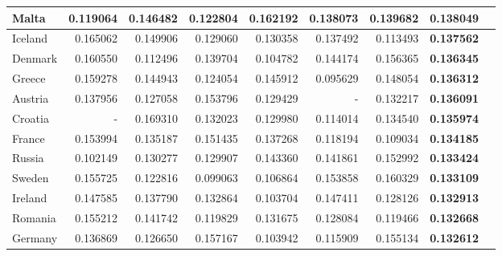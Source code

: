 \documentclass[a4paper,11pt]{report}
\begin{document}
\begin{table}[h!]
\begin{tabular}{|l|r|r|r|r|r|r|r|r|}
Malta                                                      & 0.119064      & 0.146482      & 0.122804      & 0.162192      & 0.138073      & 0.139682      & \textbf{0.138049} \\ \hline
Iceland                                                    & 0.165062      & 0.149906      & 0.129060      & 0.130358      & 0.137492      & 0.113493      & \textbf{0.137562} \\ \hline
Denmark                                                    & 0.160550      & 0.112496      & 0.139704      & 0.104782      & 0.144174      & 0.156365      & \textbf{0.136345} \\ \hline
Greece                                                     & 0.159278      & 0.144943      & 0.124054      & 0.145912      & 0.095629      & 0.148054      & \textbf{0.136312} \\ \hline
Austria                                                    & 0.137956      & 0.127058      & 0.153796      & 0.129429      & -             & 0.132217      & \textbf{0.136091} \\ \hline
Croatia                                                    & -             & 0.169310      & 0.132023      & 0.129980      & 0.114014      & 0.134540      & \textbf{0.135974} \\ \hline
France                                                     & 0.153994      & 0.135187      & 0.151435      & 0.137268      & 0.118194      & 0.109034      & \textbf{0.134185} \\ \hline
Russia                                                     & 0.102149      & 0.130277      & 0.129907      & 0.143360      & 0.141861      & 0.152992      & \textbf{0.133424} \\ \hline
Sweden                                                     & 0.155725      & 0.122816      & 0.099063      & 0.106864      & 0.153858      & 0.160329      & \textbf{0.133109} \\ \hline
Ireland                                                    & 0.147585      & 0.137790      & 0.132864      & 0.103704      & 0.147411      & 0.128126      & \textbf{0.132913} \\ \hline
Romania                                                    & 0.155212      & 0.141742      & 0.119829      & 0.131675      & 0.128084      & 0.119466      & \textbf{0.132668} \\ \hline
Germany                                                    & 0.136869      & 0.126650      & 0.157167      & 0.103942      & 0.115909      & 0.155134      & \textbf{0.132612} \\ \hline

\end{tabular}
\end{table}
\end{document}
